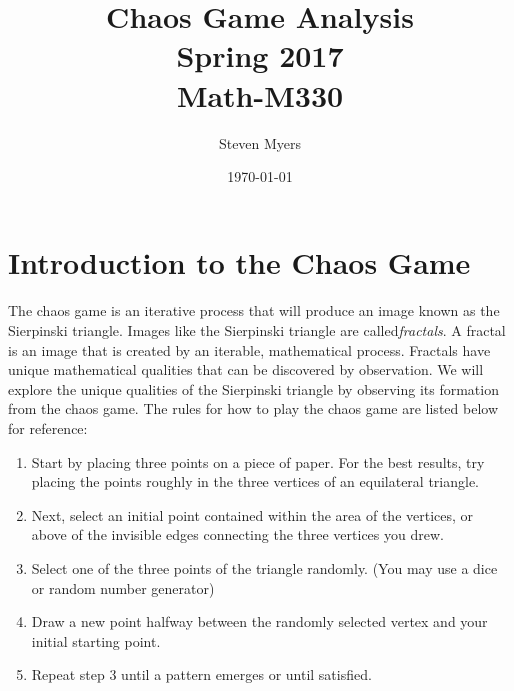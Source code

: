 \documentclass{article}
\begin{document}
\title{Chaos Game Analysis\\ Spring 2017\\ Math-M330}         %
\author{Steven Myers}        %
\date{\today}          %
\maketitle


\makeatother     %

\pagestyle{plain}

\section*{Introduction to the Chaos Game}

\paragraph{}
The chaos game is an iterative process that will produce an image known as the Sierpinski triangle. Images like the Sierpinski triangle are called\textit{fractals}. A fractal is an image that is created by an iterable, mathematical process. Fractals have unique mathematical qualities that can be discovered by observation. We will explore the unique qualities of the Sierpinski triangle by observing its formation from the chaos game. The rules for how to play the chaos game are listed below for reference:
\begin{enumerate}
    \item
    Start by placing three points on a piece of paper. For the best results, try placing the points roughly in the three vertices of an equilateral triangle.
    \item
    Next, select an initial point contained within the area of the vertices, or above of the invisible edges connecting the three vertices you drew.
    \item
    Select one of the three points of the triangle randomly. (You may use a dice or random number generator)
    \item
    Draw a new point halfway between the randomly selected vertex and your initial starting point.
    \item
    Repeat step 3 until a pattern emerges or until satisfied.
\end{enumerate}
\end{document}
